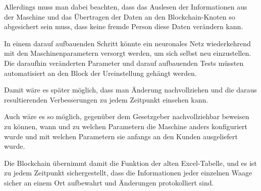 Allerdings muss man dabei beachten, dass das Auslesen der Informationen aus der Maschine und das Übertragen der Daten
an den Blockchain-Knoten so abgesichert sein muss, dass keine fremde Person diese Daten verändern kann.

In einem darauf aufbauenden Schritt könnte ein neuronales Netz wiederkehrend mit den Maschinenparametern versorgt
werden, um sich selbst neu einzustellen. Die daraufhin veränderten Parameter und darauf aufbauenden Tests müssten
automatisiert an den Block der Ureinstellung gehängt werden.

Damit wäre es später möglich, dass man Änderung nachvollziehen und die daraus resultierenden Verbesserungen zu jedem
Zeitpunkt einsehen kann.

Auch wäre es so möglich, gegenüber dem Gesetzgeber nachvollziehbar beweisen zu können, wann und zu welchen Parametern
die Maschine anders konfiguriert wurde und mit welchen Parametern sie anfangs an den Kunden ausgeliefert wurde.

Die Blockchain übernimmt damit die Funktion der alten Excel-Tabelle, und es ist zu jedem Zeitpunkt sichergestellt, dass
die Informationen jeder einzelnen Waage sicher an einem Ort aufbewahrt und Änderungen protokolliert sind.
